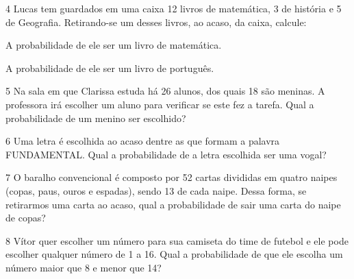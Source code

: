 \num{4} Lucas tem guardados em uma caixa 12 livros de matemática, 3 de
história e 5 de Geografia. Retirando-se um desses livros, ao acaso, da
caixa, calcule:

\begin{escolha}
\item
  A probabilidade de ele ser um livro de matemática.


\item
  A probabilidade de ele ser um livro de português.

\end{escolha}

\num{5} Na sala em que Clarissa estuda há 26 alunos, dos quais 18 são
meninas. A professora irá escolher um aluno para verificar se este fez a
tarefa. Qual a probabilidade de um menino ser escolhido?

\vspace{3cm}

\num{6} Uma letra é escolhida ao acaso dentre as que formam a palavra
FUNDAMENTAL. Qual a probabilidade de a letra escolhida ser uma vogal?


\pagebreak
\num{7} O baralho convencional é composto por 52 cartas divididas em quatro
naipes (copas, paus, ouros e espadas), sendo 13 de cada naipe. Dessa
forma, se retirarmos uma carta ao acaso, qual a probabilidade de sair
uma carta do naipe de copas?

\vspace{5cm}

\num{8} Vítor quer escolher um número para sua camiseta do time de futebol
e ele pode escolher qualquer número de 1 a 16. Qual a probabilidade de
que ele escolha um número maior que 8 e menor que 14?


